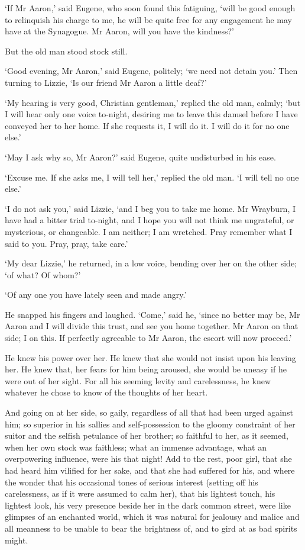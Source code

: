 ‘If Mr Aaron,’ said Eugene, who soon found this fatiguing, ‘will be good
enough to relinquish his charge to me, he will be quite free for any
engagement he may have at the Synagogue. Mr Aaron, will you have the
kindness?’

But the old man stood stock still.

‘Good evening, Mr Aaron,’ said Eugene, politely; ‘we need not detain
you.’ Then turning to Lizzie, ‘Is our friend Mr Aaron a little deaf?’

‘My hearing is very good, Christian gentleman,’ replied the old man,
calmly; ‘but I will hear only one voice to-night, desiring me to leave
this damsel before I have conveyed her to her home. If she requests it,
I will do it. I will do it for no one else.’

‘May I ask why so, Mr Aaron?’ said Eugene, quite undisturbed in his
ease.

‘Excuse me. If she asks me, I will tell her,’ replied the old man. ‘I
will tell no one else.’

‘I do not ask you,’ said Lizzie, ‘and I beg you to take me home. Mr
Wrayburn, I have had a bitter trial to-night, and I hope you will not
think me ungrateful, or mysterious, or changeable. I am neither; I am
wretched. Pray remember what I said to you. Pray, pray, take care.’

‘My dear Lizzie,’ he returned, in a low voice, bending over her on the
other side; ‘of what? Of whom?’

‘Of any one you have lately seen and made angry.’

He snapped his fingers and laughed. ‘Come,’ said he, ‘since no better
may be, Mr Aaron and I will divide this trust, and see you home
together. Mr Aaron on that side; I on this. If perfectly agreeable to Mr
Aaron, the escort will now proceed.’

He knew his power over her. He knew that she would not insist upon his
leaving her. He knew that, her fears for him being aroused, she would
be uneasy if he were out of her sight. For all his seeming levity and
carelessness, he knew whatever he chose to know of the thoughts of her
heart.

And going on at her side, so gaily, regardless of all that had been
urged against him; so superior in his sallies and self-possession to
the gloomy constraint of her suitor and the selfish petulance of her
brother; so faithful to her, as it seemed, when her own stock was
faithless; what an immense advantage, what an overpowering influence,
were his that night! Add to the rest, poor girl, that she had heard him
vilified for her sake, and that she had suffered for his, and where the
wonder that his occasional tones of serious interest (setting off his
carelessness, as if it were assumed to calm her), that his lightest
touch, his lightest look, his very presence beside her in the dark
common street, were like glimpses of an enchanted world, which it was
natural for jealousy and malice and all meanness to be unable to bear
the brightness of, and to gird at as bad spirits might.

